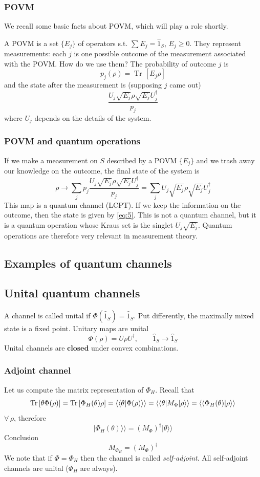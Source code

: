 \documentclass[a4paper, 11pt]{article}
\newcommand{\Tr}{\mathop{\mathrm{Tr}\!}{}}
\newcommand\kett[1]{{|{#1}\rangle\rangle}}
\begin{document}
	\subsubsection{POVM}
	We recall some basic facts about POVM, which will play a role shortly.
	
	A POVM is a set $\{E_j\}$ of operators s.t. $\sum E_j = \hat{1}_S$, $E_j\ge 0$. They represent measurements: each $j$ is one possible outcome of the measurement associated with the POVM. How do we use them?
	The probability of outcome $j$ is
	\[ p_j(\rho) = \Tr\left[ E_j \rho \right] \]
	and the state after the measurement is (supposing $j$ came out)
	\begin{equation}
	\label{eq:5}
	\dfrac{U_j \sqrt{E_j} \rho \sqrt{E_j} U_j^\dagger}{p_j}
	\end{equation}
	where $U_j$ depends on the details of the system.
	
	\subsubsection{POVM and quantum operations}
	If we make a measurement on $S$ described by a POVM $\{E_j\}$ and we trash away our knowledge on the outcome, the final state of the system is
	\[ \rho\rightarrow \sum_j p_j \dfrac{U_j \sqrt{E_j} \rho \sqrt{E_j} U_j^\dagger}{p_j} = \sum_j U_j \sqrt{E_j} \rho \sqrt{E_j} U_j^\dagger \]
	This map is a quantum channel (LCPT). If we keep the information on the outcome, then the state is given by \ref{eq:5}. This is not a quantum channel, but it is a quantum operation whose Kraus set is the singlet $U_j\sqrt{E_j}$. Quantum operations are therefore very relevant in measurement theory.
	
	\subsection{Examples of quantum channels}
	\subsection{Unital quantum channels}
	A channel is called unital if $\Phi(\hat{1}_S) = \hat{1}_S$. Put differently, the maximally mixed state is a fixed point. Unitary maps are unital
	\[ \Phi(\rho) = U\rho U^\dagger,\qquad \hat{1}_S \rightarrow \hat{1}_S \]
	Unital channels are $\mathbf{closed}$ under convex combinations.
	
	\subsubsection{Adjoint channel}
	Let us compute the matrix representation of $\Phi_H$. Recall that
	\[ \Tr\left[\theta \Phi(\rho)\right] = \Tr\left[ \Phi_H(\theta) \rho \right] = \langle\braket{\theta|\Phi(\rho)}\rangle = \langle \braket{\theta|M_\Phi|\rho}\rangle = \langle\braket{\Phi_H(\theta)|\rho}\rangle \]
	$\forall\,\rho$, therefore
	\[ \kett{\Phi_H(\theta)} = (M_\Phi)^\dagger \kett{\theta} \]
	Conclusion
	\[ M_{\Phi_H} = (M_\Phi)^\dagger \]
	We note that if $\Phi=\Phi_H$ then the channel is called \emph{self-adjoint}. All self-adjoint channels are unital ($\Phi_H$ are always).
	
\end{document}
